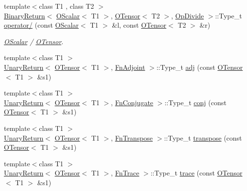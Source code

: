 \begin{DoxyCompactItemize}
{\footnotesize template$<$class T1 , class T2 $>$ }\\\mbox{\hyperlink{structENSEM_1_1BinaryReturn}{Binary\+Return}}$<$ \mbox{\hyperlink{classENSEM_1_1OScalar}{O\+Scalar}}$<$ T1 $>$, \mbox{\hyperlink{classENSEM_1_1OTensor}{O\+Tensor}}$<$ T2 $>$, \mbox{\hyperlink{structENSEM_1_1OpDivide}{Op\+Divide}} $>$\+::Type\+\_\+t \mbox{\hyperlink{group__obstensor_ga7a165136688ba38f4500951758f372d3}{operator/}} (const \mbox{\hyperlink{classENSEM_1_1OScalar}{O\+Scalar}}$<$ T1 $>$ \&l, const \mbox{\hyperlink{classENSEM_1_1OTensor}{O\+Tensor}}$<$ T2 $>$ \&r)
\begin{DoxyCompactList}\small\item\em \mbox{\hyperlink{classENSEM_1_1OScalar}{O\+Scalar}} / \mbox{\hyperlink{classENSEM_1_1OTensor}{O\+Tensor}}. \end{DoxyCompactList}\item 
{\footnotesize template$<$class T1 $>$ }\\\mbox{\hyperlink{structENSEM_1_1UnaryReturn}{Unary\+Return}}$<$ \mbox{\hyperlink{classENSEM_1_1OTensor}{O\+Tensor}}$<$ T1 $>$, \mbox{\hyperlink{structENSEM_1_1FnAdjoint}{Fn\+Adjoint}} $>$\+::Type\+\_\+t \mbox{\hyperlink{group__obstensor_ga3c5e5939e51cda2594e94fd03c07ab8b}{adj}} (const \mbox{\hyperlink{classENSEM_1_1OTensor}{O\+Tensor}}$<$ T1 $>$ \&s1)
\item 
{\footnotesize template$<$class T1 $>$ }\\\mbox{\hyperlink{structENSEM_1_1UnaryReturn}{Unary\+Return}}$<$ \mbox{\hyperlink{classENSEM_1_1OTensor}{O\+Tensor}}$<$ T1 $>$, \mbox{\hyperlink{structENSEM_1_1FnConjugate}{Fn\+Conjugate}} $>$\+::Type\+\_\+t \mbox{\hyperlink{group__obstensor_ga53d2641f95a433640eadd4ab33fed1ba}{conj}} (const \mbox{\hyperlink{classENSEM_1_1OTensor}{O\+Tensor}}$<$ T1 $>$ \&s1)
\item 
{\footnotesize template$<$class T1 $>$ }\\\mbox{\hyperlink{structENSEM_1_1UnaryReturn}{Unary\+Return}}$<$ \mbox{\hyperlink{classENSEM_1_1OTensor}{O\+Tensor}}$<$ T1 $>$, \mbox{\hyperlink{structENSEM_1_1FnTranspose}{Fn\+Transpose}} $>$\+::Type\+\_\+t \mbox{\hyperlink{group__obstensor_gad9570a0a6a341ca0e3c9a3f77fd33c3c}{transpose}} (const \mbox{\hyperlink{classENSEM_1_1OTensor}{O\+Tensor}}$<$ T1 $>$ \&s1)
\item 
{\footnotesize template$<$class T1 $>$ }\\\mbox{\hyperlink{structENSEM_1_1UnaryReturn}{Unary\+Return}}$<$ \mbox{\hyperlink{classENSEM_1_1OTensor}{O\+Tensor}}$<$ T1 $>$, \mbox{\hyperlink{structENSEM_1_1FnTrace}{Fn\+Trace}} $>$\+::Type\+\_\+t \mbox{\hyperlink{group__obstensor_gade63bf28037560bb8bb80db95b64eacf}{trace}} (const \mbox{\hyperlink{classENSEM_1_1OTensor}{O\+Tensor}}$<$ T1 $>$ \&s1)

\end{DoxyCompactItemize}

